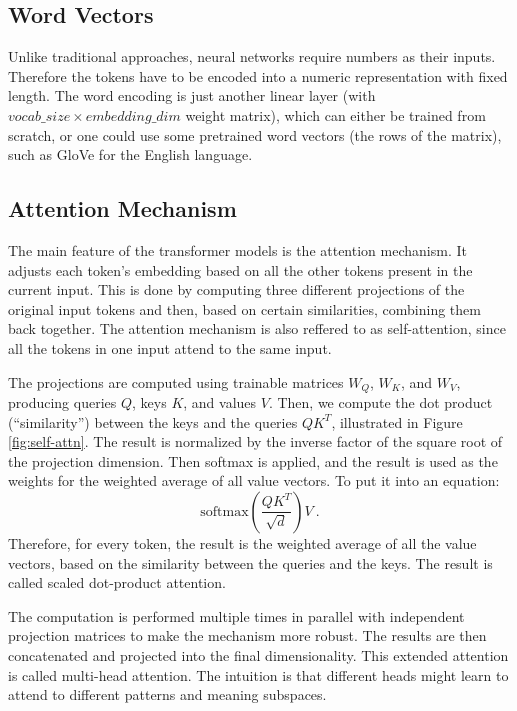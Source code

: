 \subsection{Word Vectors}

Unlike traditional approaches, neural networks require numbers as their inputs.
Therefore the tokens have to be encoded into a numeric representation with fixed length.
The word encoding is just another linear layer (with $vocab\_size \times embedding\_dim$ weight matrix), which can either be trained from scratch, or one could use some pretrained word vectors (the rows of the matrix), such as GloVe \citep{glove} for the English language.

\subsection{Attention Mechanism}
\label{subsec:attention}

The main feature of the transformer models is the attention mechanism. It adjusts each token's embedding based on all the other tokens present in the current input.
This is done by computing three different projections of the original input tokens and then, based on certain similarities, combining them back together. 
The attention mechanism is also reffered to as self-attention, since all the tokens in one input attend to the same input.

The projections are computed using trainable matrices $W_Q$, $W_K$, and $W_V$, producing queries $Q$, keys $K$, and values $V$. Then, we compute the dot product (``similarity'') between the keys and the queries $QK^T$, illustrated in Figure \ref{fig:self-attn}.
The result is normalized by the inverse factor of the square root of the projection dimension. 
Then softmax is applied, and the result is used as the weights for the weighted average of all value vectors. To put it into an equation: $$\text{softmax}(\frac{QK^T}{\sqrt{d}})V\ .$$
Therefore, for every token, the result is the weighted average of all the value vectors, based on the similarity between the queries and the keys. 
The result is called scaled dot-product attention.

The computation is performed multiple times in parallel with independent projection matrices to make the mechanism more robust.
The results are then concatenated and projected into the final dimensionality.
This extended attention is called multi-head attention.
The intuition is that different heads might learn to attend to different patterns and meaning subspaces.

